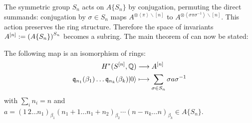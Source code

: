 The symmetric group $S_n$ acts on $A\{S_n\}$ by conjugation, permuting the direct summands: conjugation by $\sigma\in S_n$ maps $A^{\otimes\left<\pi\right>\backslash[n]}$ to $A^{\otimes\left<\sigma\pi\sigma^{{-}1}\right>\backslash[n]}$.
This action preserves the ring structure. Therefore the space of invariants $A^{[n]} := \left(A\{S_n\} \right)^{S_n}$ becomes a subring. The main theorem of \cite{LehnSorger} can now be stated:
\begin{theorem} \label{LSThm}\cite[Thm. 3.2.]{LehnSorger}
The following map is an isomorphism of rings:
\begin{align*}
H^\ast(S^{[n]},\mathbb{Q}) & \longrightarrow A^{[n]} \\
\mathfrak{q}_{n_1}(\beta_1)\ldots \mathfrak{q}_{n_k}(\beta_k) |0\rangle &\longmapsto \sum_{\sigma\in S_n} \sigma a \sigma^{{-}1} 
\end{align*}
with $\sum_i n_i=n$ and $a =(1\,2\ldots n_1)_{\beta_1}(n_1\! +\! 1\ldots n_1\!+\! n_2)_{\beta_2}\cdots (n\!-\!n_k \ldots n)_{\beta_k}\in A\{S_n\}$.
\end{theorem}

